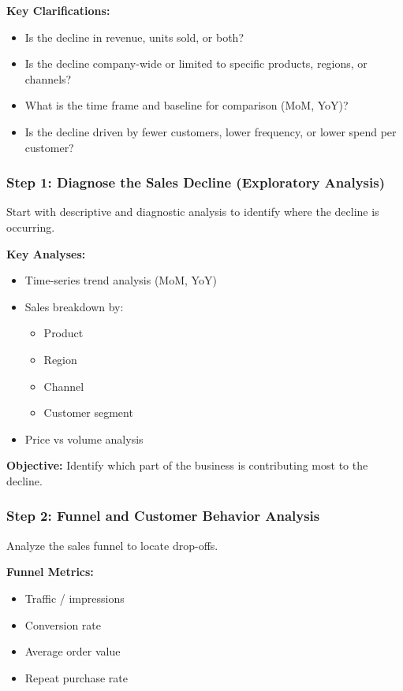 \documentclass[10pt,a4paper]{article}
\begin{document}
	\textbf{Key Clarifications:}
	\begin{itemize}
	    \item Is the decline in revenue, units sold, or both?
	    \item Is the decline company-wide or limited to specific products, regions, or channels?
	    \item What is the time frame and baseline for comparison (MoM, YoY)?
	    \item Is the decline driven by fewer customers, lower frequency, or lower spend per customer?
	\end{itemize}
	
	\subsubsection{Step 1: Diagnose the Sales Decline (Exploratory Analysis)}
	
	Start with descriptive and diagnostic analysis to identify where the decline is occurring.
	
	\textbf{Key Analyses:}
	\begin{itemize}
	    \item Time-series trend analysis (MoM, YoY)
	    \item Sales breakdown by:
	    \begin{itemize}
	        \item Product
	        \item Region
	        \item Channel
	        \item Customer segment
	    \end{itemize}
	    \item Price vs volume analysis
	\end{itemize}
	
	\textbf{Objective:} Identify which part of the business is contributing most to the decline.
	
	\subsubsection{Step 2: Funnel and Customer Behavior Analysis}
	
	Analyze the sales funnel to locate drop-offs.
	
	\textbf{Funnel Metrics:}
	\begin{itemize}
	    \item Traffic / impressions
	    \item Conversion rate
	    \item Average order value
	    \item Repeat purchase rate
	\end{itemize}
	
\end{document}
